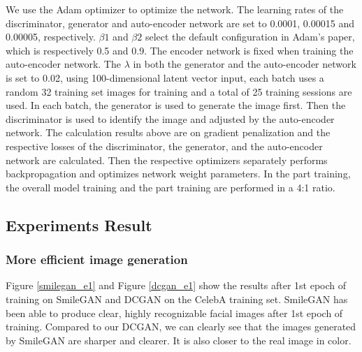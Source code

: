 We use the Adam optimizer to optimize the network.
The learning rates of the discriminator, generator and auto-encoder network are set to 0.0001, 0.00015 and 0.00005, respectively.
$\beta1$ and $\beta2$ select the default configuration in Adam's paper, which is respectively 0.5 and 0.9.
The encoder network is fixed when training the auto-encoder network.
The $\lambda$ in both the generator and the auto-encoder network is set to 0.02, using 100-dimensional latent vector input, each batch uses a random 32 training set images for training and a total of 25 training sessions are used.
In each batch, the generator is used to generate the image first.
Then the discriminator is used to identify the image and adjusted by the auto-encoder network.
The calculation results above are on gradient penalization and the respective losses of the discriminator, the generator, and the auto-encoder network are calculated.
Then the respective optimizers separately performs backpropagation and optimizes network weight parameters.
In the part training, the overall model training and the part training are performed in a 4:1 ratio.

\subsection{Experiments Result}
\subsubsection*{More efficient image generation} 
Figure \ref{smilegan_e1} and Figure \ref{dcgan_e1} show the results after 1st epoch of training on SmileGAN and DCGAN on the CelebA training set.
SmileGAN has been able to produce clear, highly recognizable facial images after 1st epoch of training.
Compared to our DCGAN, we can clearly see that the images generated by SmileGAN are sharper and clearer.
It is also closer to the real image in color.


